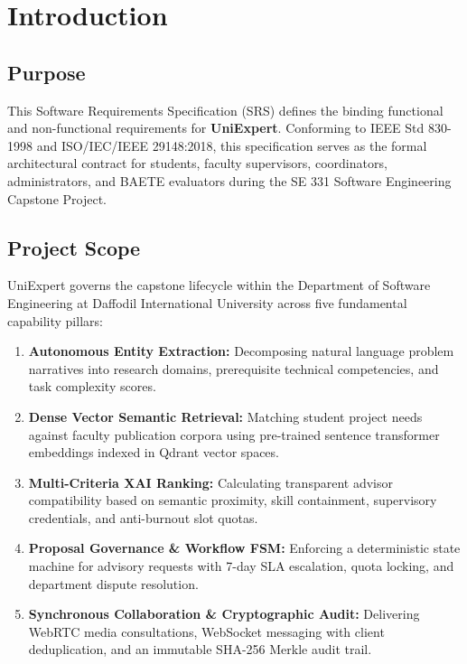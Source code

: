 \documentclass[10.5pt,a4paper]{article}
\begin{document}
\vspace{0.25cm}
\tableofcontents

\clearpage

\section{Introduction}

\subsection{Purpose}
This Software Requirements Specification (SRS) defines the binding functional and non-functional requirements for \textbf{UniExpert}. Conforming to IEEE Std 830-1998 and ISO/IEC/IEEE 29148:2018, this specification serves as the formal architectural contract for students, faculty supervisors, coordinators, administrators, and BAETE evaluators during the SE 331 Software Engineering Capstone Project.

\subsection{Project Scope}
UniExpert governs the capstone lifecycle within the Department of Software Engineering at Daffodil International University across five fundamental capability pillars:
\begin{enumerate}[leftmargin=*]
    \item \textbf{Autonomous Entity Extraction:} Decomposing natural language problem narratives into research domains, prerequisite technical competencies, and task complexity scores.
    \item \textbf{Dense Vector Semantic Retrieval:} Matching student project needs against faculty publication corpora using pre-trained sentence transformer embeddings indexed in Qdrant vector spaces.
    \item \textbf{Multi-Criteria XAI Ranking:} Calculating transparent advisor compatibility based on semantic proximity, skill containment, supervisory credentials, and anti-burnout slot quotas.
    \item \textbf{Proposal Governance \& Workflow FSM:} Enforcing a deterministic state machine for advisory requests with 7-day SLA escalation, quota locking, and department dispute resolution.
    \item \textbf{Synchronous Collaboration \& Cryptographic Audit:} Delivering WebRTC media consultations, WebSocket messaging with client deduplication, and an immutable SHA-256 Merkle audit trail.
\end{enumerate}
\end{document}
